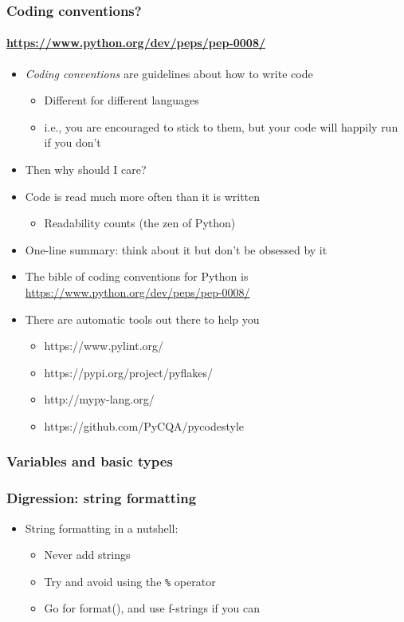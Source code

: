 \documentclass[9pt]{beamer}
\begin{document}
\begin{frame}
  \frametitle{Coding conventions?}
  \framesubtitle{\url{https://www.python.org/dev/peps/pep-0008/}}
  \begin{itemize}
  \item \emph{Coding conventions} are guidelines about how to write code
    \begin{itemize}
    \item Different for different languages
    \item i.e., you are encouraged to stick to them, but your code will
      happily run if you don't
    \end{itemize}
  \item \alert{Then why should I care?}
  \item Code is read much more often than it is written
    \begin{itemize}
    \item Readability counts (the zen of Python)
    \end{itemize}
  \item One-line summary: \alert{think about it but don't be obsessed by it}
  \item The bible of coding conventions for Python is \url{https://www.python.org/dev/peps/pep-0008/}
  \item There are automatic tools out there to help you
    \begin{itemize}
      \item https://www.pylint.org/
      \item https://pypi.org/project/pyflakes/
      \item http://mypy-lang.org/
      \item https://github.com/PyCQA/pycodestyle
    \end{itemize}
  \end{itemize}
\end{frame}


\begin{frame}
  \frametitle{Variables and basic types}
  
\end{frame}


\begin{frame}
  \frametitle{Digression: string formatting}
  
  \begin{itemize}
  \item String formatting in a nutshell:
    \begin{itemize}
    \item Never add strings
    \item Try and avoid using the \texttt{\%} operator
    \item Go for format(), and use f-strings if you can
    \end{itemize}
  \end{itemize}
\end{frame}
\end{document}
